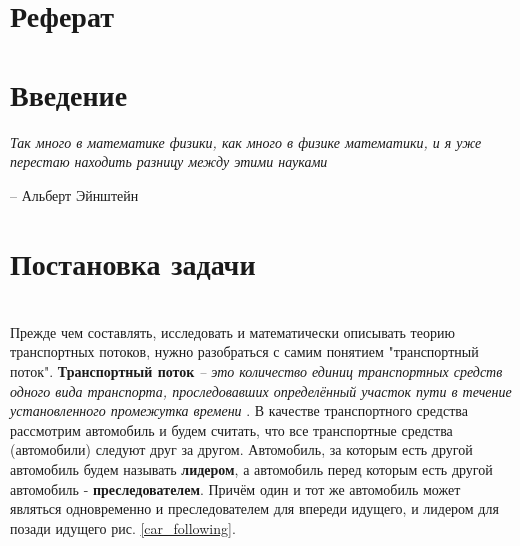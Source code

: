 \documentclass[12pt, a4paper]{extarticle}
\numberwithin{equation}{section}
\begin{document}
\justify 
\setlength{\parindent}{1.25cm} 
\newpage 
\thispagestyle{empty} 
\setcounter{page}{2} 
\section*{Реферат}
\vspace{\baselineskip}	

\newpage

\setcounter{page}{2}

\tableofcontents 
\newpage 

\section*{Введение}
\epigraph{\textit{Так много в математике физики, как много в физике математики, и я уже перестаю находить разницу между этими науками}}
{-- Альберт Эйнштейн}

\newpage

\section{Постановка задачи} 
  

\newpage
\section{}
Прежде чем составлять, исследовать и математически описывать теорию транспортных потоков, нужно разобраться с самим понятием "транспортный поток". \textbf{Транспортный поток} {\it – это количество единиц транспортных средств одного вида транспорта, проследовавших определённый участок пути в течение установленного промежутка времени} \cite{TrafficFlow}. В качестве транспортного средства рассмотрим автомобиль и будем считать, что все транспортные средства (автомобили) следуют друг за другом. Автомобиль, за которым есть другой автомобиль будем называть \textbf{лидером}, а автомобиль перед которым есть другой автомобиль - \textbf{преследователем}. Причём один и тот же автомобиль может являться одновременно и преследователем для впереди идущего, и лидером для позади идущего рис. \ref{car_following}. 
\end{document}
